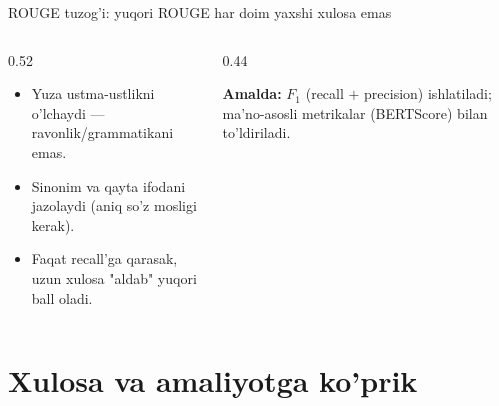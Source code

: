 \documentclass[aspectratio=169,11pt]{beamer}
\begin{document}
\begin{frame}{ROUGE tuzog'i: yuqori ROUGE har doim yaxshi xulosa emas}
  \begin{columns}[T]
    \begin{column}{0.52\textwidth}
      \begin{tcolorbox}[warnbox,title=Cheklovlar]
        \small
        \begin{itemize}\setlength\itemsep{2pt}
          \item Yuza ustma-ustlikni o'lchaydi --- ravonlik/grammatikani emas.
          \item Sinonim va qayta ifodani jazolaydi (aniq so'z mosligi kerak).
          \item Faqat recall'ga qarasak, uzun xulosa "aldab" yuqori ball oladi.
        \end{itemize}
      \end{tcolorbox}
    \end{column}
    \begin{column}{0.44\textwidth}
      \begin{tcolorbox}[okbox,top=2pt,bottom=2pt]
        \footnotesize
        \textbf{Amalda:} $F_1$ (recall $+$ precision) ishlatiladi; ma'no-asosli
        metrikalar (BERTScore) bilan to'ldiriladi.
      \end{tcolorbox}
    \end{column}
  \end{columns}
\end{frame}

\section[Xulosa]{Xulosa va amaliyotga ko'prik}
\end{document}
